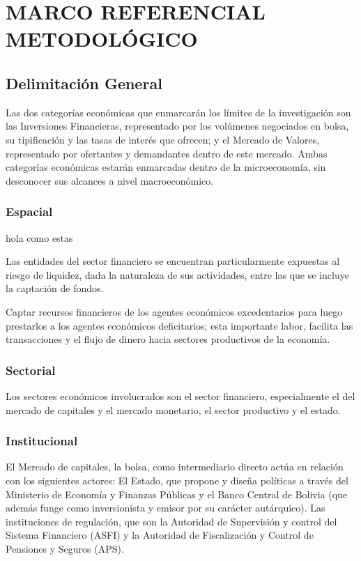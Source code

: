 \chapter{MARCO REFERENCIAL METODOLÓGICO}
\section{Delimitación General}
Las dos categorías económicas que enmarcarán los límites de la investigación son las Inversiones Financieras, representado por los volúmenes negociados en bolsa, su tipificación y las tasas de interés que ofrecen; y el Mercado de Valores, representado por ofertantes y demandantes dentro de este mercado. Ambas categorías económicas estarán enmarcadas dentro de la microeconomía, sin desconocer sus alcances a nivel macroeconómico.

\subsection{Espacial}
hola como estas

Las entidades del sector financiero se encuentran particularmente expuestas al riesgo de liquidez, dada la naturaleza de sus actividades, entre las que se incluye la captación de fondos. 

Captar recursos financieros de los agentes económicos excedentarios para luego prestarlos a los agentes económicos deficitarios; esta importante labor, facilita las transacciones y el flujo de dinero hacia sectores productivos de la economía.

\subsection{Sectorial}
Los sectores económicos involucrados son el sector financiero, especialmente el del mercado de capitales y el mercado monetario, el sector productivo y el estado.
\subsection{Institucional}

El Mercado de capitales, la bolsa, como intermediario directo actúa en relación con los siguientes actores: El Estado, que propone y diseña políticas a través del Ministerio de Economía y Finanzas Públicas y el Banco Central de Bolivia (que además funge como inversionista y emisor por su carácter autárquico).
 Las instituciones de regulación, que son la Autoridad de Supervisión y control del Sistema Financiero (ASFI) y la Autoridad de Fiscalización y Control de Pensiones y Seguros (APS).
 


